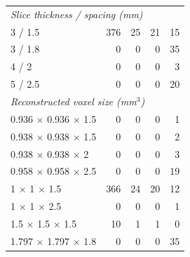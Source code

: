 \begin{tabular}{lrrrr}
    \midrule
    \multicolumn{5}{l}{\textit{Slice thickness / spacing (mm)}}                        \\
    3 / 1.5                           & 376      & 25         & 21      & 15           \\
    3 / 1.8                           & 0        & 0          & 0       & 35           \\
    4 / 2                             & 0        & 0          & 0       & 3            \\
    5 / 2.5                           & 0        & 0          & 0       & 20           \\
    \midrule
    \multicolumn{5}{l}{\textit{Reconstructed voxel size (mm$^3$)}}                     \\
    0.936 $\times$ 0.936 $\times$ 1.5 & 0        & 0          & 0       & 1            \\
    0.938 $\times$ 0.938 $\times$ 1.5 & 0        & 0          & 0       & 2            \\
    0.938 $\times$ 0.938 $\times$ 2   & 0        & 0          & 0       & 3            \\
    0.958 $\times$ 0.958 $\times$ 2.5 & 0        & 0          & 0       & 19           \\
    1 $\times$ 1 $\times$ 1.5         & 366      & 24         & 20      & 12           \\
    1 $\times$ 1 $\times$ 2.5         & 0        & 0          & 0       & 1            \\
    1.5 $\times$ 1.5 $\times$ 1.5     & 10       & 1          & 1       & 0            \\
    1.797 $\times$ 1.797 $\times$ 1.8 & 0        & 0          & 0       & 35           \\
    \bottomrule
\end{tabular}
